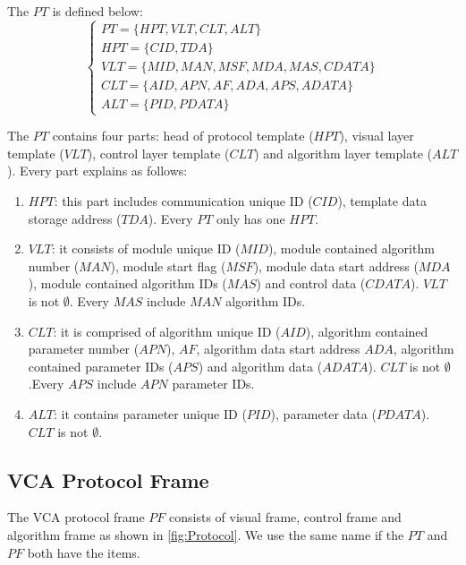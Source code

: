 \documentclass[journal,UTF8]{IEEEtran}
\begin{document}
 The $PT$ is defined below:
 \begin{equation}
 \left\{
 \begin{array}{l}
    PT = \{HPT, VLT, CLT, ALT\}\\
    HPT = \{CID, TDA\}\\
    VLT = \{MID, MAN, MSF, MDA, MAS, CDATA\}\\
    CLT = \{AID, APN, AF, ADA, APS, ADATA\}\\
    ALT = \{PID, PDATA\}
 \end{array}
 \right.
 \end{equation}
 
 The $PT$ contains four parts: head of protocol template ($HPT$), visual layer template ($VLT$), control layer template ($CLT$) and algorithm layer template ($ALT$). Every part explains as follows: 
 \begin{enumerate}
 	\item $HPT$: this part includes communication unique ID ($CID$), template data storage address ($TDA$). Every $PT$ only has one $HPT$.
 	\item $VLT$: it consists of module unique ID ($MID$), module contained algorithm number ($MAN$), module start flag ($MSF$), module data start address ($MDA$), module contained algorithm IDs ($MAS$) and control data ($CDATA$). $VLT$ is not $\emptyset$. Every $MAS$ include $MAN$ algorithm IDs. 
 	\item $CLT$: it is comprised of algorithm unique ID ($AID$), algorithm contained parameter number ($APN$), $AF$, algorithm data start address $ADA$, algorithm contained parameter IDs ($APS$) and algorithm data ($ADATA$). $CLT$ is not $\emptyset$.Every $APS$ include $APN$ parameter IDs.
 	\item $ALT$: it contains parameter unique ID ($PID$), parameter data ($PDATA$). $CLT$ is not $\emptyset$. 
 \end{enumerate}
 \subsection{VCA Protocol Frame}
 The VCA protocol frame $PF$ consists of visual frame, control frame and algorithm frame as shown in \ref{fig:Protocol}. We use the same name if the $PT$ and $PF$ both have the items.
\end{document}

